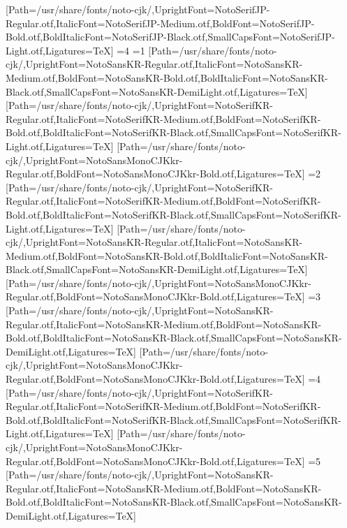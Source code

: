 [Path=/usr/share/fonts/noto-cjk/,UprightFont=NotoSerifJP-Regular.otf,ItalicFont=NotoSerifJP-Medium.otf,BoldFont=NotoSerifJP-Bold.otf,BoldItalicFont=NotoSerifJP-Black.otf,SmallCapsFont=NotoSerifJP-Light.otf,Ligatures=TeX]
\fi\fi\fi\fi\fi\fi\fi\fi\else
\ifnum\value{CJKLanguage}=4
\ifnum\value{CJKFonts}=1
[Path=/usr/share/fonts/noto-cjk/,UprightFont=NotoSansKR-Regular.otf,ItalicFont=NotoSansKR-Medium.otf,BoldFont=NotoSansKR-Bold.otf,BoldItalicFont=NotoSansKR-Black.otf,SmallCapsFont=NotoSansKR-DemiLight.otf,Ligatures=TeX]
[Path=/usr/share/fonts/noto-cjk/,UprightFont=NotoSerifKR-Regular.otf,ItalicFont=NotoSerifKR-Medium.otf,BoldFont=NotoSerifKR-Bold.otf,BoldItalicFont=NotoSerifKR-Black.otf,SmallCapsFont=NotoSerifKR-Light.otf,Ligatures=TeX]
[Path=/usr/share/fonts/noto-cjk/,UprightFont=NotoSansMonoCJKkr-Regular.otf,BoldFont=NotoSansMonoCJKkr-Bold.otf,Ligatures=TeX]
\else\ifnum\value{CJKFonts}=2
[Path=/usr/share/fonts/noto-cjk/,UprightFont=NotoSerifKR-Regular.otf,ItalicFont=NotoSerifKR-Medium.otf,BoldFont=NotoSerifKR-Bold.otf,BoldItalicFont=NotoSerifKR-Black.otf,SmallCapsFont=NotoSerifKR-Light.otf,Ligatures=TeX]
[Path=/usr/share/fonts/noto-cjk/,UprightFont=NotoSansKR-Regular.otf,ItalicFont=NotoSansKR-Medium.otf,BoldFont=NotoSansKR-Bold.otf,BoldItalicFont=NotoSansKR-Black.otf,SmallCapsFont=NotoSansKR-DemiLight.otf,Ligatures=TeX]
[Path=/usr/share/fonts/noto-cjk/,UprightFont=NotoSansMonoCJKkr-Regular.otf,BoldFont=NotoSansMonoCJKkr-Bold.otf,Ligatures=TeX]
\else\ifnum\value{CJKFonts}=3
[Path=/usr/share/fonts/noto-cjk/,UprightFont=NotoSansKR-Regular.otf,ItalicFont=NotoSansKR-Medium.otf,BoldFont=NotoSansKR-Bold.otf,BoldItalicFont=NotoSansKR-Black.otf,SmallCapsFont=NotoSansKR-DemiLight.otf,Ligatures=TeX]
[Path=/usr/share/fonts/noto-cjk/,UprightFont=NotoSansMonoCJKkr-Regular.otf,BoldFont=NotoSansMonoCJKkr-Bold.otf,Ligatures=TeX]
\else\ifnum\value{CJKFonts}=4
[Path=/usr/share/fonts/noto-cjk/,UprightFont=NotoSerifKR-Regular.otf,ItalicFont=NotoSerifKR-Medium.otf,BoldFont=NotoSerifKR-Bold.otf,BoldItalicFont=NotoSerifKR-Black.otf,SmallCapsFont=NotoSerifKR-Light.otf,Ligatures=TeX]
[Path=/usr/share/fonts/noto-cjk/,UprightFont=NotoSansMonoCJKkr-Regular.otf,BoldFont=NotoSansMonoCJKkr-Bold.otf,Ligatures=TeX]
\else\ifnum\value{CJKFonts}=5
[Path=/usr/share/fonts/noto-cjk/,UprightFont=NotoSansKR-Regular.otf,ItalicFont=NotoSansKR-Medium.otf,BoldFont=NotoSansKR-Bold.otf,BoldItalicFont=NotoSansKR-Black.otf,SmallCapsFont=NotoSansKR-DemiLight.otf,Ligatures=TeX]
